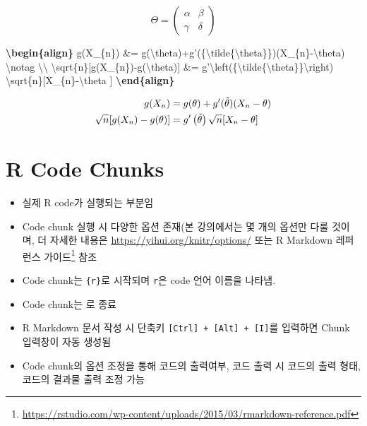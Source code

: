\documentclass[
  11pt,
]{krantz}
\newenvironment{Shaded}{\begin{snugshade}}{\end{snugshade}}
\newcommand{\ErrorTok}[1]{\textcolor[rgb]{0.14,0.14,0.14}{\textbf{#1}}}
\newcommand{\SpecialCharTok}[1]{\textcolor[rgb]{0,0,0}{#1}}
\newcommand{\SpecialStringTok}[1]{\textcolor[rgb]{0.5,0.5,0.5}{#1}}
\providecommand{\tightlist}{%
  \setlength{\itemsep}{0pt}\setlength{\parskip}{0pt}}
\renewcommand{\href}[2]{#2\footnote{\url{#1}}}
\begin{document}
\[\Theta = \begin{pmatrix}\alpha & \beta\\
\gamma & \delta
\end{pmatrix}\]

\begin{Shaded}
\begin{Highlighting}[]
\SpecialStringTok{$$}\ErrorTok{\textbackslash{}begin\{align\}}\SpecialStringTok{ }
\SpecialStringTok{g(X_\{n\}) &= g(}\SpecialCharTok{\textbackslash{}theta}\SpecialStringTok{)+g'(\{}\SpecialCharTok{\textbackslash{}tilde}\SpecialStringTok{\{}\SpecialCharTok{\textbackslash{}theta}\SpecialStringTok{\}\})(X_\{n\}-}\SpecialCharTok{\textbackslash{}theta}\SpecialStringTok{) }\SpecialCharTok{\textbackslash{}notag}\SpecialStringTok{ }\SpecialCharTok{\textbackslash{}\textbackslash{}}
\SpecialCharTok{\textbackslash{}sqrt}\SpecialStringTok{\{n\}[g(X_\{n\})-g(}\SpecialCharTok{\textbackslash{}theta}\SpecialStringTok{)] &= g'}\SpecialCharTok{\textbackslash{}left}\SpecialStringTok{(\{}\SpecialCharTok{\textbackslash{}tilde}\SpecialStringTok{\{}\SpecialCharTok{\textbackslash{}theta}\SpecialStringTok{\}\}}\SpecialCharTok{\textbackslash{}right}\SpecialStringTok{)}
\SpecialStringTok{  }\SpecialCharTok{\textbackslash{}sqrt}\SpecialStringTok{\{n\}[X_\{n\}-}\SpecialCharTok{\textbackslash{}theta}\SpecialStringTok{ ]}
\ErrorTok{\textbackslash{}end\{align\}}\SpecialStringTok{$$}
\end{Highlighting}
\end{Shaded}

\[\begin{aligned} 
g(X_{n}) &= g(\theta)+g'({\tilde{\theta}})(X_{n}-\theta) \notag \\
\sqrt{n}[g(X_{n})-g(\theta)] &= g'\left({\tilde{\theta}}\right)
  \sqrt{n}[X_{n}-\theta ]
\end{aligned}\]

\hypertarget{r-code-chunks}{%
\section{R Code Chunks}\label{r-code-chunks}}

\begin{itemize}
\tightlist
\item
  실제 R code가 실행되는 부분임
\item
  Code chunk 실행 시 다양한 옵션 존재(본 강의에서는 몇 개의 옵션만 다룰 것이며, 더 자세한 내용은 \url{https://yihui.org/knitr/options/} 또는 \href{https://rstudio.com/wp-content/uploads/2015/03/rmarkdown-reference.pdf}{R Markdown 레퍼런스 가이드} 참조
\item
  Code chunk는 \texttt{\textasciigrave{}\textasciigrave{}\textasciigrave{}\{r\}}로 시작되며 \texttt{r}은 code 언어 이름을 나타냄.
\item
  Code chunk는 \texttt{\textasciigrave{}\textasciigrave{}\textasciigrave{}} 로 종료
\item
  R Markdown 문서 작성 시 단축키 \texttt{{[}Ctrl{]}\ +\ {[}Alt{]}\ +\ {[}I{]}}를 입력하면 Chunk 입력창이 자동 생성됨
\item
  Code chunk의 옵션 조정을 통해 코드의 출력여부, 코드 출력 시 코드의 출력 형태, 코드의 결과물 출력 조정 가능
\end{itemize}
\end{document}
